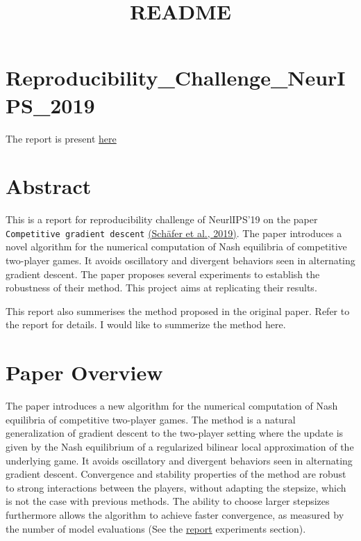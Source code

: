 \documentclass[11pt]{article}
\title{README}
\begin{document}
    
    
    \maketitle
    
    

    
    \section{Reproducibility\_Challenge\_NeurIPS\_2019}\label{reproducibility_challenge_neurips_2019}

The report is present
\href{https://gopikishan14.github.io/Reproducibility_Challenge_NeurIPS_2019/}{here}

\section{Abstract}\label{abstract}

This is a report for reproducibility challenge of NeurlIPS'19 on the
paper \texttt{Competitive\ gradient\ descent}
\href{https://arxiv.org/abs/1905.12103}{(Schäfer et al., 2019)}. The
paper introduces a novel algorithm for the numerical computation of Nash
equilibria of competitive two-player games. It avoids oscillatory and
divergent behaviors seen in alternating gradient descent. The paper
proposes several experiments to establish the robustness of their
method. This project aims at replicating their results.

This report also summerises the method proposed in the original paper.
Refer to the report for details. I would like to summerize the method
here.

    \section{Paper Overview}\label{paper-overview}

The paper introduces a new algorithm for the numerical computation of
Nash equilibria of competitive two-player games. The method is a natural
generalization of gradient descent to the two-player setting where the
update is given by the Nash equilibrium of a regularized bilinear local
approximation of the underlying game. It avoids oscillatory and
divergent behaviors seen in alternating gradient descent. Convergence
and stability properties of the method are robust to strong interactions
between the players, without adapting the stepsize, which is not the
case with previous methods. The ability to choose larger stepsizes
furthermore allows the algorithm to achieve faster convergence, as
measured by the number of model evaluations (See the
\href{https://gopikishan14.github.io/Reproducibility_Challenge_NeurIPS_2019/}{report}
experiments section).
\end{document}
